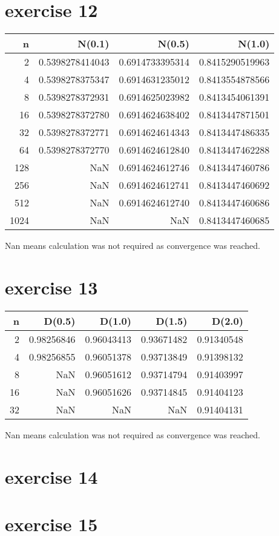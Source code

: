 \documentclass{article}
\begin{document}
\section{exercise 12}
\begin{tabular}{rrrr}
    \toprule
    n    & N(0.1)          & N(0.5)          & N(1.0)          \\
    \midrule
    2    & 0.5398278414043 & 0.6914733395314 & 0.8415290519963 \\
    4    & 0.5398278375347 & 0.6914631235012 & 0.8413554878566 \\
    8    & 0.5398278372931 & 0.6914625023982 & 0.8413454061391 \\
    16   & 0.5398278372780 & 0.6914624638402 & 0.8413447871501 \\
    32   & 0.5398278372771 & 0.6914624614343 & 0.8413447486335 \\
    64   & 0.5398278372770 & 0.6914624612840 & 0.8413447462288 \\
    128  & NaN             & 0.6914624612746 & 0.8413447460786 \\
    256  & NaN             & 0.6914624612741 & 0.8413447460692 \\
    512  & NaN             & 0.6914624612740 & 0.8413447460686 \\
    1024 & NaN             & NaN             & 0.8413447460685 \\
    \bottomrule
\end{tabular}
Nan means calculation was not required as convergence was reached.

\section{exercise 13}

\begin{tabular}{rrrrr}
    \toprule
    n  & D(0.5)     & D(1.0)     & D(1.5)     & D(2.0)     \\
    \midrule
    2  & 0.98256846 & 0.96043413 & 0.93671482 & 0.91340548 \\
    4  & 0.98256855 & 0.96051378 & 0.93713849 & 0.91398132 \\
    8  & NaN        & 0.96051612 & 0.93714794 & 0.91403997 \\
    16 & NaN        & 0.96051626 & 0.93714845 & 0.91404123 \\
    32 & NaN        & NaN        & NaN        & 0.91404131 \\
    \bottomrule
\end{tabular}
Nan means calculation was not required as convergence was reached.
\section{exercise 14}
\section{exercise 15}
\end{document}
